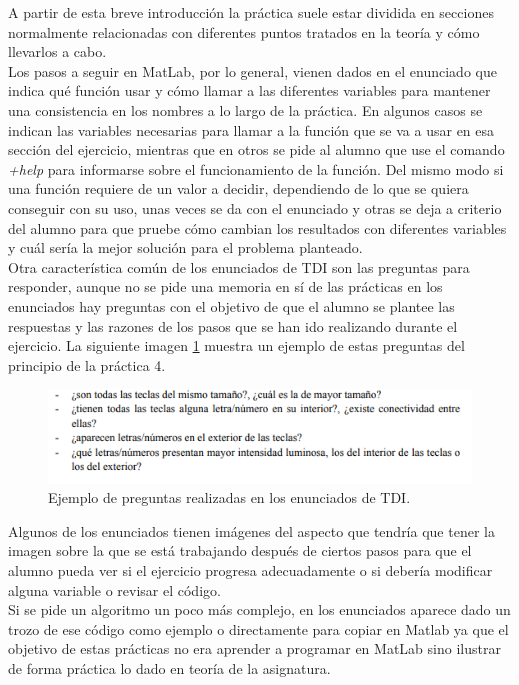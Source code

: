 A partir de esta breve introducción la práctica suele estar dividida en secciones normalmente relacionadas con diferentes puntos tratados en la teoría y cómo llevarlos a cabo.\\

Los pasos a seguir en MatLab, por lo general, vienen dados en el enunciado que indica qué función usar y cómo llamar a las diferentes variables para mantener una consistencia en los nombres a lo largo de la práctica. En algunos casos se indican las variables necesarias para llamar a la función que se va a usar en esa sección del ejercicio, mientras que en otros se pide al alumno que use el comando \textsl{+help} para informarse sobre el funcionamiento de la función. Del mismo modo si una función requiere de un valor a decidir, dependiendo de lo que se quiera conseguir con su uso, unas veces se da con el enunciado y otras se deja a criterio del alumno para que pruebe cómo cambian los resultados con diferentes variables y cuál sería la mejor solución para el problema planteado.\\

Otra característica común de los enunciados de TDI son las preguntas para responder, aunque no se pide una memoria en sí de las prácticas en los enunciados hay preguntas con el objetivo de que el alumno se plantee las respuestas y las razones de los pasos que se han ido realizando durante el ejercicio.  La siguiente imagen \ref{preguntasp4} muestra un ejemplo de estas preguntas del principio de la práctica 4.

\begin{figure}[h]
\centering
\includegraphics[width=1\textwidth]{imagenes/preguntasp4}
\caption{Ejemplo de preguntas realizadas en los enunciados de TDI.}
\label{preguntasp4}
\end{figure}

Algunos de los enunciados tienen imágenes del aspecto que tendría que tener la imagen sobre la que se está trabajando después de ciertos pasos para que el alumno pueda ver si el ejercicio progresa adecuadamente o si debería modificar alguna variable o revisar el código.\\

Si se pide un algoritmo un poco más complejo, en los enunciados aparece dado un trozo de ese código como ejemplo o directamente para copiar en Matlab ya que el objetivo de estas prácticas no era aprender a programar en MatLab sino ilustrar de forma práctica lo dado en teoría de la asignatura.\\


